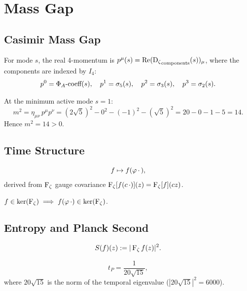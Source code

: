 \chapter{Mass Gap}
\label{ch:mass}

\section{Casimir Mass Gap}

\begin{definition}
\label{def:4-momentum}
For mode $s$, the real 4-momentum is
$p^\mu(s) = \operatorname{Re}(\operatorname{D_\zeta}_{\text{components}}(s))_\mu$, where
the components are indexed by $I_4$:
\[
  p^0 = \Phi_A\text{-coeff}(s),\quad
  p^1 = \sigma_5(s),\quad
  p^2 = \sigma_3(s),\quad
  p^3 = \sigma_2(s).
\]
\end{definition}

\begin{theorem}
\label{thm:casimir}
At the minimum active mode $s=1$:
\[
  m^2 = \eta_{\mu\nu}\,p^\mu p^\nu
      = (2\sqrt5)^2 - 0^2 - (-1)^2 - (\sqrt5)^2
      = 20 - 0 - 1 - 5 = 14.
\]
Hence $m^2 = 14 > 0$.
\end{theorem}

\section{Time Structure}

\begin{definition}
\label{def:time-evolution}
\[
  f \mapsto f(\varphi\,\cdot\,),
\]
derived from $\operatorname{F_\zeta}$ gauge covariance
$\operatorname{F_\zeta}[f(c\,\cdot)](z) = \operatorname{F_\zeta}[f](cz)$.
\end{definition}

\begin{theorem}
\label{thm:ker-invariant}
$f\in\ker(\operatorname{F_\zeta}) \implies f(\varphi\,\cdot)\in\ker(\operatorname{F_\zeta})$.
\end{theorem}

\section{Entropy and Planck Second}

\begin{definition}[Entropy]
\label{def:entropy}
\[
  S(f)(z) := |\operatorname{F_\zeta} f(z)|^2.
\]
\end{definition}

\begin{definition}
\label{def:planck-second}
\[
  t_P = \frac{1}{20\sqrt{15}},
\]
where $20\sqrt{15}$ is the norm of the temporal eigenvalue
($|20\sqrt{15}|^2 = 6000$).
\end{definition}
